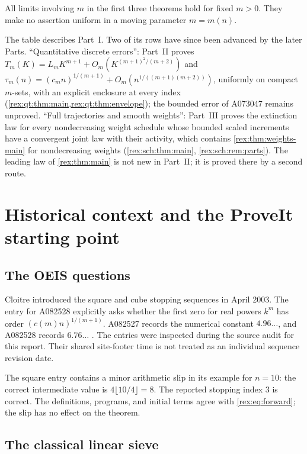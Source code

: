 All limits involving $m$ in the first three theorems hold for fixed $m>0$.
They make no assertion uniform in a moving parameter $m=m(n)$.

\begin{writenote}
The table describes Part~I. Two of its rows have since been advanced by
the later Parts. ``Quantitative discrete errors'': Part~II proves
$T_m(K)=L_mK^{m+1}+O_m(K^{(m+1)^2/(m+2)})$ and
$\tau_m(n)=(c_mn)^{1/(m+1)}+O_m(n^{1/((m+1)(m+2))})$, uniformly on compact
$m$-sets, with an explicit enclosure at every index
(\cref{rex:qt:thm:main,rex:qt:thm:envelope}); the bounded error of A073047
remains unproved. ``Full trajectories and smooth weights'': Part~III proves
the extinction law for every nondecreasing weight schedule whose bounded
scaled increments have a convergent joint law with their activity, which
contains \cref{rex:thm:weights-main} for nondecreasing weights
(\cref{rex:sch:thm:main}, \cref{rex:sch:rem:parts}). The leading law of
\cref{rex:thm:main} is not new in Part~II; it is proved there by a second
route.
\end{writenote}

\section{Historical context and the ProveIt starting point}\label{rex:sec:history}

\subsection{The OEIS questions}

Cloitre introduced the square and cube stopping sequences in April 2003.
The entry for A082528 explicitly asks whether the first zero for real
powers $k^m$ has order $(c(m)n)^{1/(m+1)}$. A082527 records the numerical
constant $4.96\ldots$, and A082528 records $6.76\ldots$
\cite{oeis-square,oeis-cube}. The entries were inspected during the source
audit for this report. Their shared site-footer time is not treated as an
individual sequence revision date.

The square entry contains a minor arithmetic slip in its example for
$n=10$: the correct intermediate value is
$4\lfloor10/4\rfloor=8$. The reported stopping index $3$ is correct.
The definitions, programs, and initial terms agree with
\cref{rex:eq:forward}; the slip has no effect on the theorem.

\subsection{The classical linear sieve}

